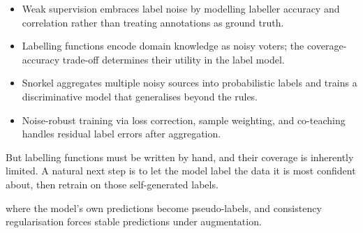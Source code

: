 \vspace{1.5em}


\begin{itemize}
    \item Weak supervision embraces label noise by modelling labeller accuracy and correlation rather than treating annotations as ground truth.
    \item Labelling functions encode domain knowledge as noisy voters; the coverage-accuracy trade-off determines their utility in the label model.
    \item Snorkel aggregates multiple noisy sources into probabilistic labels and trains a discriminative model that generalises beyond the rules.
    \item Noise-robust training via loss correction, sample weighting, and co-teaching handles residual label errors after aggregation.
\end{itemize}

\vspace{2.5em}


 But labelling functions must be written by hand, and their coverage is inherently limited. A natural next step is to let the model label the data it is most confident about, then retrain on those self-generated labels.

 where the model's own predictions become pseudo-labels, and consistency regularisation forces stable predictions under augmentation.

